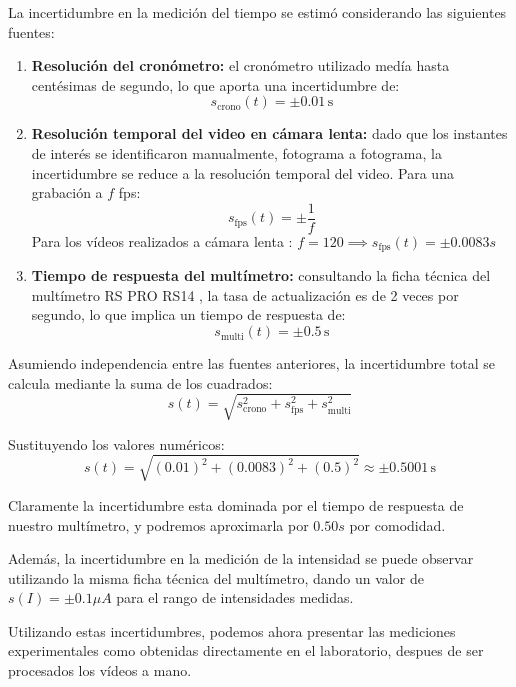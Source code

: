 \documentclass[12pt, letterpaper]{article} %
\theoremstyle{plain} %
\begin{document}
La incertidumbre en la medición del tiempo se estimó considerando las siguientes fuentes:

\begin{enumerate}
    \item \textbf{Resolución del cronómetro:} el cronómetro utilizado medía hasta centésimas de segundo, lo que aporta una incertidumbre de:
    \[
        s_{\text{crono}}(t) = \pm 0.01\,\text{s}
    \]
    
    \item \textbf{Resolución temporal del video en cámara lenta:} dado que los instantes de interés se identificaron manualmente, fotograma a fotograma, la incertidumbre se reduce a la resolución temporal del video. Para una grabación a \( f \) fps:
    \[
        s_{\text{fps}}(t) = \pm \frac{1}{f}
    \]
	Para los vídeos realizados a cámara lenta : $f = 120 \implies s_{\text{fps}}(t) = \pm 0.0083 s$
    
\item \textbf{Tiempo de respuesta del multímetro:} consultando la ficha técnica del multímetro RS PRO RS14 \cite{rs14datasheet}, la tasa de actualización es de 2 veces por segundo, lo que implica un tiempo de respuesta de:
    \[
        s_{\text{multi}}(t) = \pm 0.5\,\text{s}
    \]
    
\end{enumerate}

Asumiendo independencia entre las fuentes anteriores, la incertidumbre total se calcula mediante la suma de los cuadrados:
\[
	s(t) = \sqrt{
	s_{\text{crono}}^2 +
	s_{\text{fps}}^2 +
	s_{\text{multi}}^2
	}
\]

\noindent Sustituyendo los valores numéricos:
\[
	s(t) = \sqrt{
	(0.01)^2 +
	(0.0083)^2 +
	(0.5)^2
	} \approx \pm 0.5001\,\text{s}
\]

Claramente la incertidumbre esta dominada por el tiempo de respuesta de nuestro multímetro, y podremos aproximarla por $0.50s$ por comodidad.

Además, la incertidumbre en la medición de la intensidad se puede observar utilizando la misma ficha técnica del multímetro, dando un valor de $s(I) = \pm 0.1 \mu A$ para el rango de intensidades medidas.

Utilizando estas incertidumbres, podemos ahora presentar las mediciones experimentales como obtenidas directamente en el laboratorio, despues de ser procesados los vídeos a mano. \newpage

\end{document}
